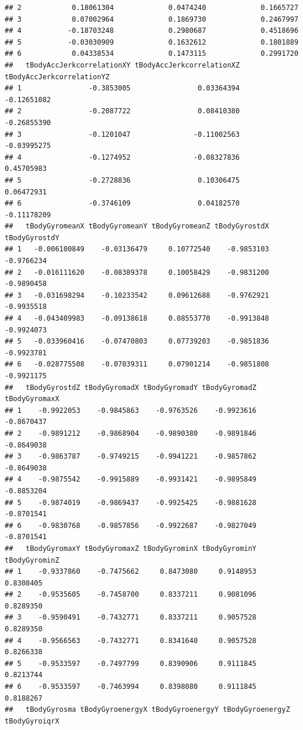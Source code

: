 \documentclass[
]{article}
\begin{document}
\begin{verbatim}
## 2            0.18061304             0.0474240             0.1665727
## 3            0.07002964             0.1869730             0.2467997
## 4           -0.18703248             0.2980687             0.4518696
## 5           -0.03030909             0.1632612             0.1801889
## 6            0.04338534             0.1473115             0.2991720
##   tBodyAccJerkcorrelationXY tBodyAccJerkcorrelationXZ tBodyAccJerkcorrelationYZ
## 1                -0.3853005                0.03364394               -0.12651082
## 2                -0.2087722                0.08410380               -0.26855390
## 3                -0.1201047               -0.11002563               -0.03995275
## 4                -0.1274952               -0.08327836                0.45705983
## 5                -0.2728836                0.10306475                0.06472931
## 6                -0.3746109                0.04182570               -0.11178209
##   tBodyGyromeanX tBodyGyromeanY tBodyGyromeanZ tBodyGyrostdX tBodyGyrostdY
## 1   -0.006100849    -0.03136479     0.10772540    -0.9853103    -0.9766234
## 2   -0.016111620    -0.08389378     0.10058429    -0.9831200    -0.9890458
## 3   -0.031698294    -0.10233542     0.09612688    -0.9762921    -0.9935518
## 4   -0.043409983    -0.09138618     0.08553770    -0.9913848    -0.9924073
## 5   -0.033960416    -0.07470803     0.07739203    -0.9851836    -0.9923781
## 6   -0.028775508    -0.07039311     0.07901214    -0.9851808    -0.9921175
##   tBodyGyrostdZ tBodyGyromadX tBodyGyromadY tBodyGyromadZ tBodyGyromaxX
## 1    -0.9922053    -0.9845863    -0.9763526    -0.9923616    -0.8670437
## 2    -0.9891212    -0.9868904    -0.9890380    -0.9891846    -0.8649038
## 3    -0.9863787    -0.9749215    -0.9941221    -0.9857862    -0.8649038
## 4    -0.9875542    -0.9915889    -0.9931421    -0.9895849    -0.8853204
## 5    -0.9874019    -0.9869437    -0.9925425    -0.9881628    -0.8701541
## 6    -0.9830768    -0.9857856    -0.9922687    -0.9827049    -0.8701541
##   tBodyGyromaxY tBodyGyromaxZ tBodyGyrominX tBodyGyrominY tBodyGyrominZ
## 1    -0.9337860    -0.7475662     0.8473080     0.9148953     0.8308405
## 2    -0.9535605    -0.7458700     0.8337211     0.9081096     0.8289350
## 3    -0.9590491    -0.7432771     0.8337211     0.9057528     0.8289350
## 4    -0.9566563    -0.7432771     0.8341640     0.9057528     0.8266338
## 5    -0.9533597    -0.7497799     0.8390906     0.9111845     0.8213744
## 6    -0.9533597    -0.7463994     0.8398080     0.9111845     0.8188267
##   tBodyGyrosma tBodyGyroenergyX tBodyGyroenergyY tBodyGyroenergyZ tBodyGyroiqrX

\end{verbatim}
\end{document}
